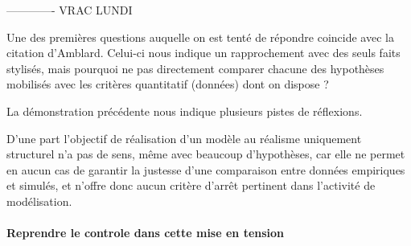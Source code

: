 












------------- VRAC LUNDI



 Une des premières questions auquelle on est tenté de répondre coincide avec la citation d'Amblard. Celui-ci nous indique un rapprochement avec des seuls faits stylisés, mais pourquoi ne pas directement comparer chacune des hypothèses mobilisés avec les critères quantitatif (données) dont on dispose ? 







La démonstration précédente nous indique plusieurs pistes de réflexions.

D'une part l'objectif de réalisation d'un modèle au réalisme uniquement structurel n'a pas de sens, même avec beaucoup d'hypothèses, car elle ne permet en aucun cas de garantir la justesse d'une comparaison entre données empiriques et simulés, et n'offre donc aucun critère d'arrêt pertinent dans l'activité de modélisation.






 


\paragraph{Reprendre le controle dans cette mise en tension}
\label{p:critere_evaluation}





